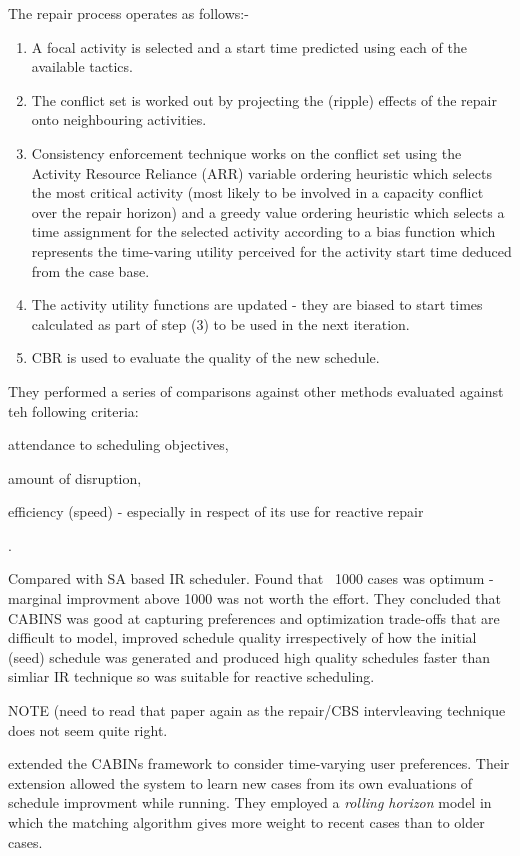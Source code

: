 The repair process operates as follows:-
\begin{enumerate}
\item A focal activity is selected and a start time predicted using each of the available tactics.
\item The conflict set is worked out by projecting the (ripple) effects of the repair onto neighbouring activities.
\item Consistency enforcement technique works on the conflict set using the Activity Resource Reliance (ARR) variable ordering heuristic which selects the most critical activity (most likely to be involved in a capacity conflict over the repair horizon) and a greedy value ordering heuristic which selects a time assignment for the selected activity according to a bias function which represents the time-varing utility perceived for the activity start time deduced from the case base.
\item The activity utility functions are updated - they are biased to start times calculated as part of step (3) to be used in the next iteration.
\item CBR is used to evaluate the quality of the new schedule.
\end{enumerate}
They performed a series of comparisons against other methods evaluated against teh following criteria: \begin{inparaenum} \item attendance to scheduling objectives, \item amount of disruption, \item efficiency (speed) - especially in respect of its use for reactive repair \end{inparaenum}.

Compared with SA based IR scheduler. Found that ~1000 cases was optimum - marginal improvment above 1000 was not worth the effort. They concluded that CABINS was good at capturing preferences and optimization trade-offs that are difficult to model, improved schedule quality irrespectively of how the initial (seed) schedule was generated and produced high quality schedules faster than simliar IR technique so was suitable for reactive scheduling.


NOTE (need to read that paper again as the repair/CBS intervleaving technique does not seem quite right.

\cite{sycara96case} extended the CABINs framework to consider time-varying user preferences. Their extension allowed the system to learn new cases from its own evaluations of schedule improvment while running. They employed a \emph{rolling horizon} model in which the matching algorithm gives more weight to recent cases than to older cases.

